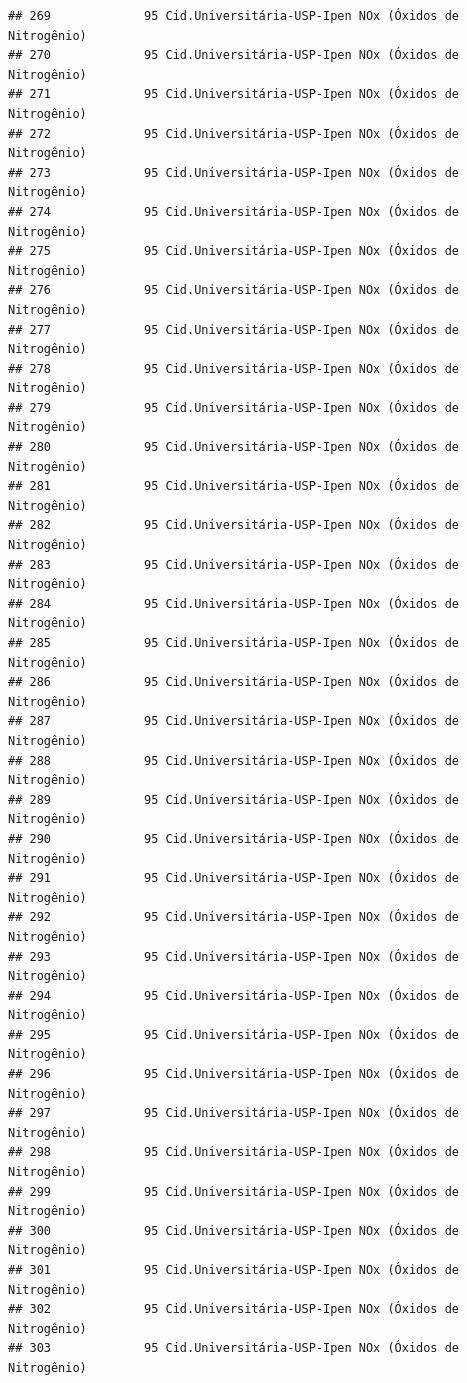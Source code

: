 \documentclass[]{book}
\begin{document}
\begin{verbatim}
## 269             95 Cid.Universitária-USP-Ipen NOx (Óxidos de Nitrogênio)
## 270             95 Cid.Universitária-USP-Ipen NOx (Óxidos de Nitrogênio)
## 271             95 Cid.Universitária-USP-Ipen NOx (Óxidos de Nitrogênio)
## 272             95 Cid.Universitária-USP-Ipen NOx (Óxidos de Nitrogênio)
## 273             95 Cid.Universitária-USP-Ipen NOx (Óxidos de Nitrogênio)
## 274             95 Cid.Universitária-USP-Ipen NOx (Óxidos de Nitrogênio)
## 275             95 Cid.Universitária-USP-Ipen NOx (Óxidos de Nitrogênio)
## 276             95 Cid.Universitária-USP-Ipen NOx (Óxidos de Nitrogênio)
## 277             95 Cid.Universitária-USP-Ipen NOx (Óxidos de Nitrogênio)
## 278             95 Cid.Universitária-USP-Ipen NOx (Óxidos de Nitrogênio)
## 279             95 Cid.Universitária-USP-Ipen NOx (Óxidos de Nitrogênio)
## 280             95 Cid.Universitária-USP-Ipen NOx (Óxidos de Nitrogênio)
## 281             95 Cid.Universitária-USP-Ipen NOx (Óxidos de Nitrogênio)
## 282             95 Cid.Universitária-USP-Ipen NOx (Óxidos de Nitrogênio)
## 283             95 Cid.Universitária-USP-Ipen NOx (Óxidos de Nitrogênio)
## 284             95 Cid.Universitária-USP-Ipen NOx (Óxidos de Nitrogênio)
## 285             95 Cid.Universitária-USP-Ipen NOx (Óxidos de Nitrogênio)
## 286             95 Cid.Universitária-USP-Ipen NOx (Óxidos de Nitrogênio)
## 287             95 Cid.Universitária-USP-Ipen NOx (Óxidos de Nitrogênio)
## 288             95 Cid.Universitária-USP-Ipen NOx (Óxidos de Nitrogênio)
## 289             95 Cid.Universitária-USP-Ipen NOx (Óxidos de Nitrogênio)
## 290             95 Cid.Universitária-USP-Ipen NOx (Óxidos de Nitrogênio)
## 291             95 Cid.Universitária-USP-Ipen NOx (Óxidos de Nitrogênio)
## 292             95 Cid.Universitária-USP-Ipen NOx (Óxidos de Nitrogênio)
## 293             95 Cid.Universitária-USP-Ipen NOx (Óxidos de Nitrogênio)
## 294             95 Cid.Universitária-USP-Ipen NOx (Óxidos de Nitrogênio)
## 295             95 Cid.Universitária-USP-Ipen NOx (Óxidos de Nitrogênio)
## 296             95 Cid.Universitária-USP-Ipen NOx (Óxidos de Nitrogênio)
## 297             95 Cid.Universitária-USP-Ipen NOx (Óxidos de Nitrogênio)
## 298             95 Cid.Universitária-USP-Ipen NOx (Óxidos de Nitrogênio)
## 299             95 Cid.Universitária-USP-Ipen NOx (Óxidos de Nitrogênio)
## 300             95 Cid.Universitária-USP-Ipen NOx (Óxidos de Nitrogênio)
## 301             95 Cid.Universitária-USP-Ipen NOx (Óxidos de Nitrogênio)
## 302             95 Cid.Universitária-USP-Ipen NOx (Óxidos de Nitrogênio)
## 303             95 Cid.Universitária-USP-Ipen NOx (Óxidos de Nitrogênio)

\end{verbatim}
\end{document}
